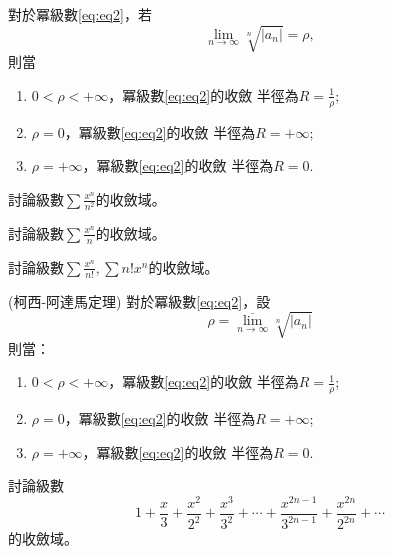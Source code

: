 \documentclass[a4paper,12pt]{article}
\theoremstyle{theorem}
\begin{document}
\begin{CJK*}{UTF8}{bsmi}
\begin{remark}
    \end{remark}

    \begin{theorem}
    對於冪級數\ref{eq:eq2}，若
    \begin{equation}
        \lim_{n \to \infty}\sqrt[n]{\vert a_n \vert} = \rho,
        \label{eq:eq3}
    \end{equation}
    則當
    \begin{enumerate}[label={\rm(\arabic*)}]
        \item $\displaystyle 0 < \rho < +\infty$，冪級數\ref{eq:eq2}的收斂
            半徑為$\displaystyle R = \frac{1}{\rho}$;
        \item $\displaystyle \rho = 0$，冪級數\ref{eq:eq2}的收斂
            半徑為$\displaystyle R = +\infty$;
        \item $\displaystyle \rho = +\infty$，冪級數\ref{eq:eq2}的收斂
            半徑為$\displaystyle R = 0$.
    \end{enumerate}
    \end{theorem}

    \begin{example}
        討論級數$\displaystyle \sum \frac{x^n}{n^2}$的收斂域。
    \end{example}

\begin{example}
    討論級數$\displaystyle \sum \frac{x^n}{n}$的收斂域。
\end{example}

\begin{example}
    討論級數$\displaystyle \sum \frac{x^n}{n!}, \sum n! x^n$的收斂域。
\end{example}

\begin{theorem}{\rm(柯西-阿達馬定理)}
    對於冪級數\ref{eq:eq2}，設
    \[
        \rho = \overline{\lim_{n \to \infty}}\sqrt[n]{\vert a_n \vert}
        \]
    則當：
    \begin{enumerate}[label={\rm(\arabic*)}]
        \item $\displaystyle 0 < \rho < +\infty$，冪級數\ref{eq:eq2}的收斂
            半徑為$\displaystyle R = \frac{1}{\rho}$;
        \item $\displaystyle \rho = 0$，冪級數\ref{eq:eq2}的收斂
            半徑為$\displaystyle R = +\infty$;
        \item $\displaystyle \rho = +\infty$，冪級數\ref{eq:eq2}的收斂
            半徑為$\displaystyle R = 0$.
    \end{enumerate}
\end{theorem}
\begin{example}
    討論級數
    \[
        1 + \frac{x}{3} + \frac{x^2}{2^2} + \frac{x^3}{3^2} + 
        \cdots + \frac{x^{2n-1}}{3^{2n-1}} + \frac{x^{2n}}{2^{2n}} + \cdots
        \]
    的收斂域。
\end{example}


\end{CJK*}
\end{document}
